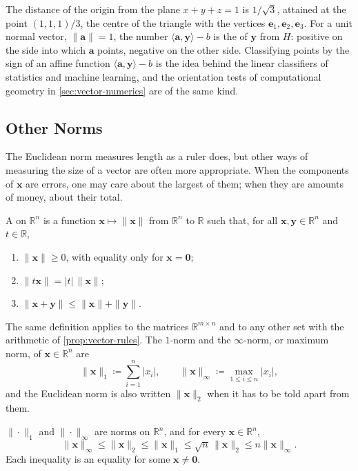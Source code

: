 The distance of the origin from the plane $x+y+z=1$ is $1/\sqrt3$, attained at the point $(1,1,1)/3$, the centre of the triangle with the vertices $\mathbf e_1,\mathbf e_2,\mathbf e_3$. For a unit normal vector, $\|\mathbf a\|=1$, the number $\langle\mathbf a,\mathbf y\rangle-b$ is the  of $\mathbf y$ from $H$: positive on the side into which $\mathbf a$ points, negative on the other side. Classifying points by the sign of an affine function $\langle\mathbf a,\mathbf y\rangle-b$ is the idea behind the linear classifiers of statistics and machine learning, and the orientation tests of computational geometry in \cref{sec:vector-numerics} are of the same kind.

\subsection{Other Norms}

The Euclidean norm measures length as a ruler does, but other ways of measuring the size of a vector are often more appropriate. When the components of $\mathbf x$ are errors, one may care about the largest of them; when they are amounts of money, about their total.

\begin{definition}[Norm]
\label{def:norm}
A  on $\mathbb R^n$ is a function $\mathbf x\mapsto\|\mathbf x\|$ from $\mathbb R^n$ to $\mathbb R$ such that, for all $\mathbf x,\mathbf y\in\mathbb R^n$ and $t\in\mathbb R$,
\begin{enumerate}
\item $\|\mathbf x\|\ge0$, with equality only for $\mathbf x=\mathbf 0$;
\item $\|t\mathbf x\|=|t|\,\|\mathbf x\|$;
\item $\|\mathbf x+\mathbf y\|\le\|\mathbf x\|+\|\mathbf y\|$.
\end{enumerate}
The same definition applies to the matrices $\mathbb R^{m\times n}$ and to any other set with the arithmetic of \cref{prop:vector-rules}. The $1$-norm and the $\infty$-norm, or maximum norm, of $\mathbf x\in\mathbb R^n$ are
\[
\|\mathbf x\|_1\coloneqq\sum_{i=1}^n|x_i|,\qquad\|\mathbf x\|_\infty\coloneqq\max_{1\le i\le n}|x_i| ,
\]
and the Euclidean norm is also written $\|\mathbf x\|_2$ when it has to be told apart from them.
\end{definition}

\begin{proposition}
\label{prop:standard-norms}
$\|\cdot\|_1$ and $\|\cdot\|_\infty$ are norms on $\mathbb R^n$, and for every $\mathbf x\in\mathbb R^n$,
\[
\|\mathbf x\|_\infty\le\|\mathbf x\|_2\le\|\mathbf x\|_1\le\sqrt n\,\|\mathbf x\|_2\le n\|\mathbf x\|_\infty .
\]
Each inequality is an equality for some $\mathbf x\ne\mathbf 0$.
\end{proposition}

